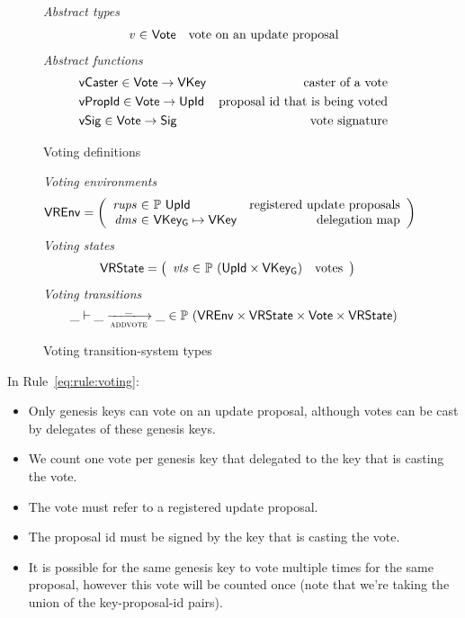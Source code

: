\begin{figure}[htb]
  \emph{Abstract types}
  \begin{equation*}
    \begin{array}{r@{~\in~}lr}
      \var{v} & \Vote & \text{vote on an update proposal}
    \end{array}
  \end{equation*}
  \emph{Abstract functions}
  \begin{align*}
    & \mathsf{vCaster} \in \mathsf{Vote} \to \mathsf{VKey} & \text{caster of a vote}\\
    & \mathsf{vPropId} \in \mathsf{Vote} \to \mathsf{UpId} & \text{proposal id that is being voted}\\
    & \mathsf{vSig} \in \mathsf{Vote} \to \mathsf{Sig} & \text{vote signature}
  \end{align*}
  \caption{Voting definitions}
  \label{fig:defs:voting}
\end{figure}

\begin{figure}[htb]
  \emph{Voting environments}
  \begin{align*}
    & \VREnv
      = \left(
      \begin{array}{r@{~\in~}lr}
        \var{rups} & \powerset{\UPropId}
        & \text{registered update proposals}\\
        \var{dms} & \VKeyGen \mapsto \VKey & \text{delegation map}
      \end{array}\right)
  \end{align*}
  \emph{Voting states}
  \begin{align*}
    & \VRState
      = \left(
      \begin{array}{r@{~\in~}lr}
        \var{vts} & \powerset{(\UPropId \times \VKeyGen)} & \text{votes}
      \end{array}\right)
  \end{align*}
  \emph{Voting transitions}
    \begin{equation*}
    \_ \vdash \_ \trans{addvote}{\_} \_ \in
    \powerset (\VREnv \times \VRState \times \Vote \times \VRState)
    \end{equation*}
  \caption{Voting transition-system types}
  \label{fig:ts-types:voting}
\end{figure}

In Rule~\ref{eq:rule:voting}:
\begin{itemize}
\item Only genesis keys can vote on an update proposal, although votes can be
  cast by delegates of these genesis keys.
\item We count one vote per genesis key that delegated to the key that is
  casting the vote.
\item The vote must refer to a registered update proposal.
\item The proposal id must be signed by the key that is casting the vote.
\item It is possible for the same genesis key to vote multiple times for
  the same proposal, however this vote will be counted once (note that we're
  taking the union of the key-proposal-id pairs).
\end{itemize}

